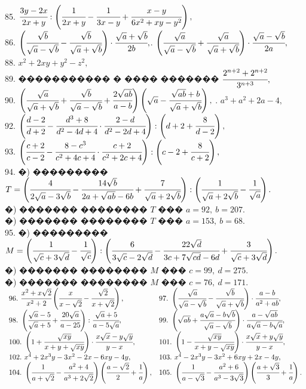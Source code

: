 \documentclass[12pt]{article}
\begin{document}
85. $\cfrac{3y-2x}{2x+y}:\left(\cfrac{1}{2x+y}-\cfrac{1}{3x-y}+\cfrac{x-y}{6x^2+xy-y^2}\right),$\\
86. $\left(\cfrac{\sqrt{b}}{\sqrt{a}-\sqrt{b}}-\cfrac{\sqrt{b}}{\sqrt{a}+\sqrt{b}}\right)\cdot\cfrac{\sqrt{a}+\sqrt{b}}{2b},$\qquad{}. $\left(\cfrac{\sqrt{a}}{\sqrt{a}-\sqrt{b}}+\cfrac{\sqrt{a}}{\sqrt{a}+\sqrt{b}}\right)\cdot\cfrac{\sqrt{a}-\sqrt{b}}{2a},$\\
88. $x^2+2xy+y^2-z^2,$\\
89. ����������� � ���� ������� $\cfrac{2^{n+2}+2^{n+2}}{3^{n+3}},$\\
90. $\left(\cfrac{\sqrt{a}}{\sqrt{a}+\sqrt{b}}+\cfrac{\sqrt{b}}{\sqrt{a}-\sqrt{b}}+\cfrac{2\sqrt{ab}}{a-b}\right)\left(\sqrt{a}-\cfrac{\sqrt{ab}+b}{\sqrt{a}+\sqrt{b}}\right),$
. $a^3+a^2+2a-4,$\\
92. $\left(\cfrac{d-2}{d+2}-\cfrac{d^3+8}{d^2-4d+4}\cdot\cfrac{2-d}{d^2-2d+4}\right):\left(d+2+\cfrac{8}{d-2}\right),$\\
93. $\left(\cfrac{c+2}{c-2}-\cfrac{8-c^3}{c^2+4c+4}\cdot\cfrac{c+2}{c^2+2c+4}\right):\left(c-2+\cfrac{8}{c+2}\right),$\\
94. �) ��������� $T=\left(\cfrac{4}{2\sqrt{a}-3\sqrt{b}}-\cfrac{14\sqrt{b}}{2a+\sqrt{ab}-6b}+\cfrac{7}{\sqrt{a}+2\sqrt{b}}\right):\left(\cfrac{1}{\sqrt{a}+2\sqrt{b}}-\cfrac{1}{\sqrt{a}}\right).$\\
�) ������� �������� $T$ ��� $a=92,\ b=207.$\\
�) ������� �������� $T$ ��� $a=153,\ b=68.$\\
95. �) ��������� $M=\left(\cfrac{1}{\sqrt{c}+3\sqrt{d}}-\cfrac{1}{\sqrt{c}}\right):\left(\cfrac{6}{3\sqrt{c}-2\sqrt{d}}-\cfrac{22\sqrt{d}}{3c+7\sqrt{cd}-6d}+\cfrac{3}{\sqrt{c}+3\sqrt{d}}\right).$\\
�) ������� �������� $M$ ��� $c=99,\ d=275.$\\
�) ������� �������� $M$ ��� $c=76,\ d=171.$\\
$\begin{array}{ll}
96.\ \cfrac{x^2+x\sqrt{2}}{x^2+2}\left(\cfrac{x}{x-\sqrt{2}}-\cfrac{\sqrt{2}}{x+\sqrt{2}}\right),&
97.\ \left(\cfrac{\sqrt{a}}{\sqrt{a}-\sqrt{b}}-\cfrac{\sqrt{b}}{\sqrt{a}+\sqrt{b}}\right)\cdot\cfrac{a-b}{a^2+ab},\\
98.\ \left(\cfrac{\sqrt{a}-5}{\sqrt{a}+5}+\cfrac{20\sqrt{a}}{a-25}\right):\cfrac{\sqrt{a}+5}{a-5\sqrt{a}},&
99.\ \left(\sqrt{ab}+\cfrac{a\sqrt{a}-b\sqrt{b}}{\sqrt{a}-\sqrt{b}}\right)\cdot\cfrac{a-\sqrt{ab}}{a\sqrt{a}-b\sqrt{a}},\\
100.\ \left(1+\cfrac{\sqrt{xy}}{x+y+\sqrt{xy}}\right)\cdot\cfrac{x\sqrt{x}-y\sqrt{y}}{y-x},&
101.\ \left(1-\cfrac{\sqrt{xy}}{x+y-\sqrt{xy}}\right)\cdot\cfrac{x\sqrt{x}+y\sqrt{y}}{y-x},\\
102.\ x^4+2x^3y-3x^2-2x-6xy-4y,&
103.\ x^4-2x^3y-3x^2+6xy+2x-4y,\\
104.\ \left(\cfrac{1}{a+\sqrt{2}}-\cfrac{a^2+4}{a^3+2\sqrt{2}}\right) \left (\cfrac{a-\sqrt{2}}{2}+\cfrac{1}{a}\right),&
105.\ \left(\cfrac{1}{a-\sqrt{3}}-\cfrac{a^2+6}{a^3-3\sqrt{3}}\right) \left (\cfrac{a+\sqrt{3}}{3}+\cfrac{1}{a}\right).
\end{array}$
\newpage
\end{document}
